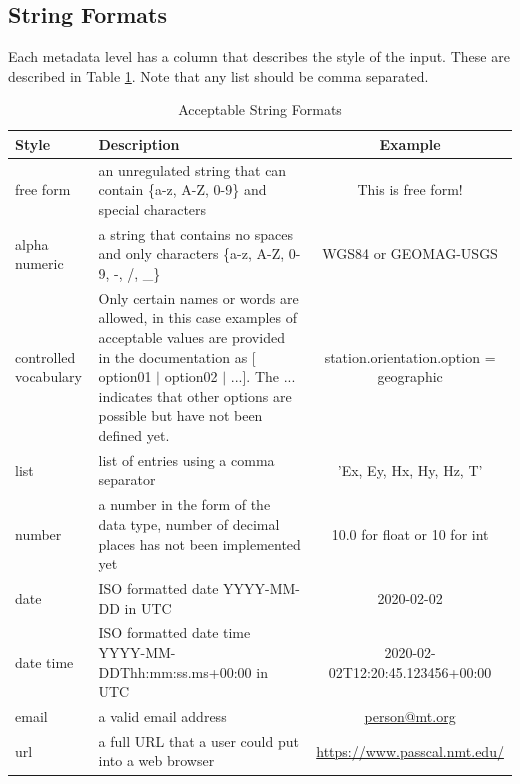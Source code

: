 \documentclass[12pt]{article}
\begin{document}
\subsection{String Formats}

Each metadata level has a column that describes the style of the input.  These are described in Table \ref{tab:values}.  Note that any list should be comma separated.

\begin{table}[htb!]
	\centering
	\caption[Acceptable String Formats]{Acceptable String Formats}
	\begin{tabular}{p{.8in}p{3.1in}c}
		\toprule
		\textbf{Style} & \textbf{Description}  & \textbf{Example} \\ \midrule
		free form & an unregulated string that can contain \{a-z, A-Z, 0-9\} and special characters & This is free form! \\ \midrule
		
		alpha numeric & a string that contains no spaces and only characters \{a-z, A-Z, 0-9, -, /, \_\} & WGS84 or GEOMAG-USGS \\ \midrule
		controlled vocabulary & Only certain names or words are allowed, in this case examples of acceptable values are provided in the documentation as [ option01 $|$ option02 $|$ ...]. The ... indicates that other options are possible but have not been defined yet. &  station.orientation.option = geographic \\ \midrule
		list & list of entries using a comma separator & 'Ex, Ey, Hx, Hy, Hz, T' \\ \midrule
		number & a number in the form of the data type, number of decimal places has not been implemented yet & 10.0 for float or 10 for int \\ \midrule
		date & ISO formatted date YYYY-MM-DD in UTC & 2020-02-02 \\ \midrule
		date time & ISO formatted date time YYYY-MM-DDThh:mm:ss.ms+00:00 in UTC & 2020-02-02T12:20:45.123456+00:00 \\ \midrule
		email & a valid email address & \url{person@mt.org} \\ \midrule
		url & a full URL that a user could put into a web browser  &  \url{https://www.passcal.nmt.edu/} \\ \bottomrule
		
		
	\end{tabular}
	\label{tab:values}
\end{table}
\end{document}
